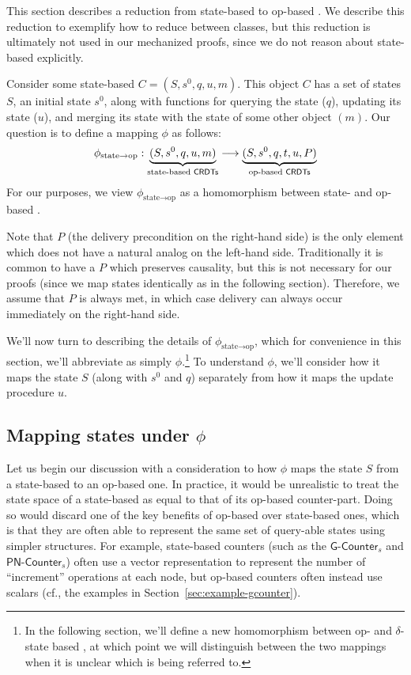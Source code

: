 This section describes a reduction from state-based \CRDTs to op-based \CRDTs.
We describe this reduction to exemplify how to reduce between \CRDT classes, but
this reduction is ultimately not used in our mechanized proofs, since we do not
reason about state-based \CRDTs explicitly.

Consider some state-based \CRDT $C = (S, s^0, q, u, m)$. This object $C$ has a
set of states $S$, an initial state $s^0$, along with functions for querying the
state ($q$), updating its state ($u$), and merging its state with the state of
some other object $(m)$. Our question is to define a mapping $\phi$ as
follows:
\[
  \phi_{\text{state} \to \text{op}} :
    \underbrace{(S, s^0, q, u, m)}_{\text{state-based \textsf{CRDTs}}} \longrightarrow
    \underbrace{(S, s^0, q, t, u, P)}_{\text{op-based \textsf{CRDTs}}}
\]
For our purposes, we view $\phi_{\text{state} \to \text{op}}$ as a homomorphism
between state- and op-based \CRDTs.

Note that $P$ (the delivery precondition on the right-hand side) is the only
element which does not have a natural analog on the left-hand side.
Traditionally it is common to have a $P$ which preserves causality, but this is
not necessary for our proofs (since we map states identically as in the
following section). Therefore, we assume that $P$ is always met, in which case
delivery can always occur immediately on the right-hand side.

We'll now turn to describing the details of $\phi_{\text{state} \to \text{op}}$,
which for convenience in this section, we'll abbreviate as simply
$\phi$.\footnote{In the following section, we'll define a new homomorphism
between op- and $\delta$-state based \CRDTs, at which point we will
distinguish between the two mappings when it is unclear which is being referred
to.} To understand $\phi$, we'll consider how it maps the state $S$ (along with
$s^0$ and $q$) separately from how it maps the update procedure $u$.

\subsection{Mapping states under $\phi$}

Let us begin our discussion with a consideration to how $\phi$ maps the state
$S$ from a state-based \CRDT to an op-based one. In practice, it would be
unrealistic to treat the state space of a state-based \CRDT as equal to that of
its op-based counter-part. Doing so would discard one of the key benefits of
op-based \CRDTs over state-based ones, which is that they are often able to
represent the same set of query-able states using simpler structures. For
example, state-based counters (such as the $\textsf{G-Counter}_s$ and
$\textsf{PN-Counter}_s$) often use a vector representation to represent the
number of ``increment'' operations at each node, but op-based counters often
instead use scalars (cf., the examples in Section~\ref{sec:example-gcounter}).

